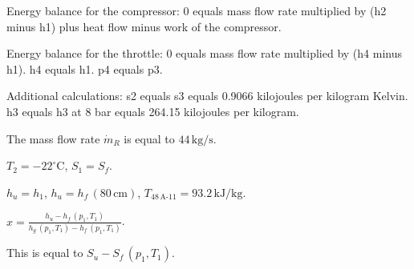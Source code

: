Energy balance for the compressor:  
0 equals mass flow rate multiplied by (h2 minus h1) plus heat flow minus work of the compressor.  

Energy balance for the throttle:  
0 equals mass flow rate multiplied by (h4 minus h1).  
h4 equals h1.  
p4 equals p3.  

Additional calculations:  
s2 equals s3 equals 0.9066 kilojoules per kilogram Kelvin.  
h3 equals h3 at 8 bar equals 264.15 kilojoules per kilogram.

The mass flow rate \( \dot{m}_R \) is equal to \( 44 \, \text{kg/s} \).  

\( T_2 = -22^\circ \text{C} \), \( S_1 = S_f \).  

\( h_u = h_1 \), \( h_u = h_f \, (80 \, \text{cm}) \), \( T_{48 \, \text{A-11}} = 93.2 \, \text{kJ/kg} \).  

\( x = \frac{h_u - h_f \, (p_1, T_1)}{h_g \, (p_1, T_1) - h_f \, (p_1, T_1)} \).  

This is equal to \( S_u - S_f \, (p_1, T_1) \).